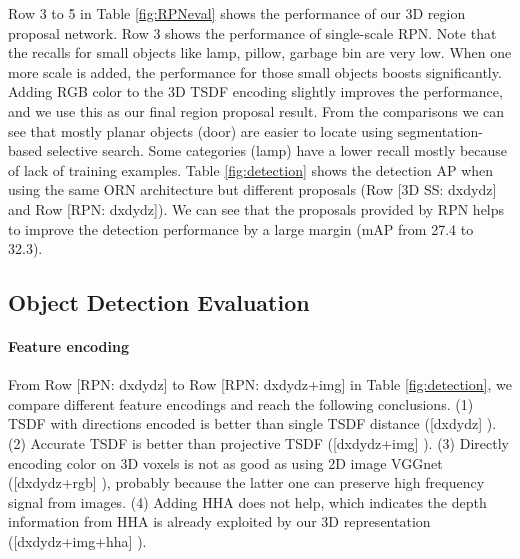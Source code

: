 \documentclass[10pt,twocolumn,letterpaper]{article}
\begin{document}
Row 3 to 5 in Table \ref{fig:RPNeval} shows the performance of our 3D region proposal network. 
Row 3 shows the performance of single-scale RPN. 
Note that the recalls for small objects like lamp, pillow, garbage bin are very low. 
When one more scale is added, the performance for those small objects boosts significantly.
Adding RGB color to the 3D TSDF encoding slightly improves the performance,
and we use this as our final region proposal result.
From the comparisons we can see that mostly planar objects (\eg door) are easier to locate using segmentation-based selective search.
Some categories (\eg lamp) have a lower recall mostly because of lack of training examples.
Table \ref{fig:detection} shows the detection AP when using the same ORN architecture but different proposals (Row [3D SS: dxdydz] and Row [RPN: dxdydz]). 
We can see that the proposals provided by RPN helps to improve the detection performance by a large margin (mAP from 27.4 to 32.3). 












\subsection{Object Detection Evaluation}

\paragraph{Feature encoding}

From Row [RPN: dxdydz] to Row [RPN: dxdydz+img] in Table \ref{fig:detection}, we compare different feature encodings and reach the following conclusions.
(1) TSDF with directions encoded is better than single TSDF distance ([dxdydz] ).
(2) Accurate TSDF is better than projective TSDF  ([dxdydz+img] ). 
(3) Directly encoding color on 3D voxels is not as good as using 2D image VGGnet ([dxdydz+rgb] ),
probably because the latter one can preserve high frequency signal from images.
(4) Adding HHA does not help, which indicates the depth information from HHA is already exploited by our 3D representation ([dxdydz+img+hha] ).
\end{document}
